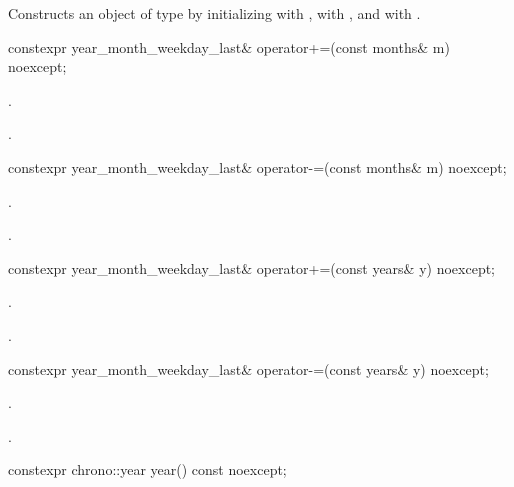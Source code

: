 \begin{itemdescr}
\pnum
\effects
Constructs an object of type  by
initializing  with ,  with , and  with .
\end{itemdescr}

%
\begin{itemdecl}
constexpr year_month_weekday_last& operator+=(const months& m) noexcept;
\end{itemdecl}

\begin{itemdescr}
\pnum
\effects
{}.

\pnum
\returns
{}.
\end{itemdescr}

%
\begin{itemdecl}
constexpr year_month_weekday_last& operator-=(const months& m) noexcept;
\end{itemdecl}

\begin{itemdescr}
\pnum
\effects
{}.

\pnum
\returns
{}.
\end{itemdescr}

%
\begin{itemdecl}
constexpr year_month_weekday_last& operator+=(const years& y) noexcept;
\end{itemdecl}

\begin{itemdescr}
\pnum
\effects
{}.

\pnum
\returns
{}.
\end{itemdescr}

%
\begin{itemdecl}
constexpr year_month_weekday_last& operator-=(const years& y) noexcept;
\end{itemdecl}

\begin{itemdescr}
\pnum
\effects
{}.

\pnum
\returns
{}.
\end{itemdescr}

%
\begin{itemdecl}
constexpr chrono::year year() const noexcept;
\end{itemdecl}

